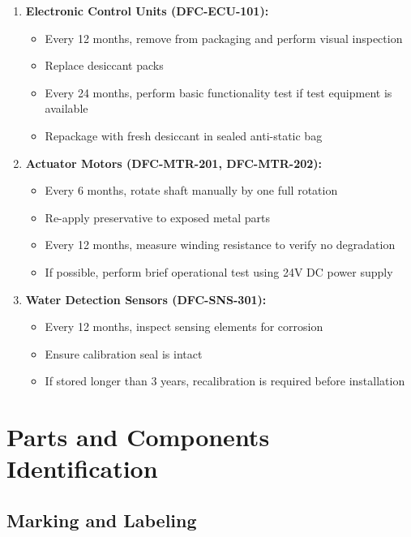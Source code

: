 \documentclass[12pt,a4paper,twoside,openright]{book}
\begin{document}
\begin{enumerate}
    \item \textbf{Electronic Control Units (DFC-ECU-101):}
    \begin{itemize}
        \item Every 12 months, remove from packaging and perform visual inspection
        \item Replace desiccant packs
        \item Every 24 months, perform basic functionality test if test equipment is available
        \item Repackage with fresh desiccant in sealed anti-static bag
    \end{itemize}
    
    \item \textbf{Actuator Motors (DFC-MTR-201, DFC-MTR-202):}
    \begin{itemize}
        \item Every 6 months, rotate shaft manually by one full rotation
        \item Re-apply preservative to exposed metal parts
        \item Every 12 months, measure winding resistance to verify no degradation
        \item If possible, perform brief operational test using 24V DC power supply
    \end{itemize}
    
    \item \textbf{Water Detection Sensors (DFC-SNS-301):}
    \begin{itemize}
        \item Every 12 months, inspect sensing elements for corrosion
        \item Ensure calibration seal is intact
        \item If stored longer than 3 years, recalibration is required before installation
    \end{itemize}
\end{enumerate}

\section{Parts and Components Identification}

\subsection{Marking and Labeling}
\end{document}
